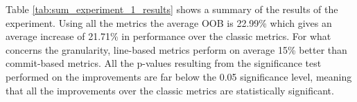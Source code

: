 Table \ref{tab:sum_experiment_1_results} shows a summary of the results of the experiment. Using all the metrics the average OOB is 22.99\% which gives an average increase of 21.71\%  in performance over the classic metrics. For what concerns the granularity, line-based metrics perform on average 15\% better than commit-based metrics.
All the p-values resulting from the significance test performed on the improvements are far below the 0.05 significance level, meaning that all the improvements over the classic metrics are statistically significant.



